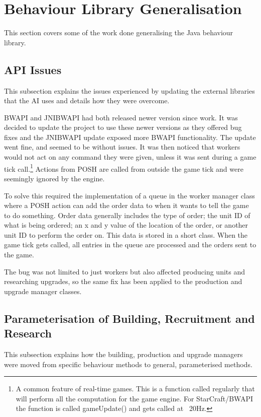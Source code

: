 \documentclass[11pt,openright,a4paper]{report}
\begin{document}
\section{Behaviour Library Generalisation}
This section covers some of the work done generalising the Java behaviour library.
\subsection{API Issues}
\label{APIIssue}
This subsection explains the issues experienced by updating the external libraries that the AI uses and details how they were overcome.

BWAPI and JNIBWAPI had both released newer version since  work. It was decided to update the project to use these newer versions as they offered bug fixes and the JNIBWAPI update exposed more BWAPI functionality. The update went fine, and seemed to be without issues. It was then noticed that workers would not act on any command they were given, unless it was sent during a game tick call.\footnote{A common feature of real-time games. This is a function called regularly that will perform all the computation for the game engine. For StarCraft/BWAPI the function is called gameUpdate() and gets called at ~20Hz.} Actions from POSH are called from outside the game tick and were seemingly ignored by the engine.

To solve this required the implementation of a queue in the worker manager class where a POSH action can add the order data to when it wants to tell the game to do something. Order data generally includes the type of order; the unit ID of what is being ordered; an x and y value of the location of the order, or another unit ID to perform the order on. This data is stored in a short class. When the game tick gets called, all entries in the queue are processed and the orders sent to the game.

The bug was not limited to just workers but also affected producing units and researching upgrades, so the same fix has been applied to the production and upgrade manager classes.


\subsection{Parameterisation of Building, Recruitment and Research}
This subsection explains how the building, production and upgrade managers were moved from specific behaviour methods to general, parameterised methods.
\end{document}
